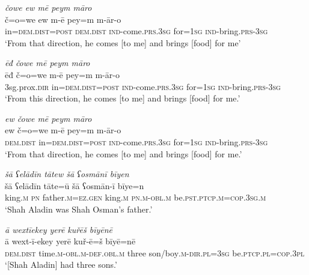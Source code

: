 \ea \label{PM.46}
\textit{čowe ew mē peym māro} \\ 
\gll č=o=we ew m-ē pey=m m-ār-o \\ 
 in=\textsc{dem.dist}\textsc{=\textsc{post}} \textsc{dem.dist} \textsc{ind-}come\textsc{.prs}\textsc{.3sg} for\textsc{=\textsc{1sg}} \textsc{ind-}bring\textsc{.prs}\textsc{-3sg} \\ 
\glt `From that direction, he  comes [to me] and brings [food] for me'
\z 
 
\ea \label{PM.47}
\textit{ēđ čowe mē peym māro} \\ 
\gll ēđ č=o=we m-ē pey=m m-ār-o \\ 
 3sg.prox\textsc{.dir} in=\textsc{dem.dist}\textsc{=\textsc{post}} \textsc{ind-}come\textsc{.prs}\textsc{.3sg} for\textsc{=\textsc{1sg}} \textsc{ind-}bring\textsc{.prs}\textsc{-3sg} \\ 
\glt `From this direction, he  comes [to me] and brings [food] for me.'
\z 
 
\ea \label{PM.48}
\textit{ew čowe mē peym māro} \\ 
\gll ew č=o=we m-ē pey=m m-ār-o \\ 
 \textsc{dem.dist} in=\textsc{dem.dist}\textsc{=\textsc{post}} \textsc{ind-}come\textsc{.prs}\textsc{.3sg} for\textsc{=\textsc{1sg}} \textsc{ind-}bring\textsc{.prs}\textsc{-3sg} \\ 
\glt `From that direction, he  comes [to me] and brings [food] for me.'
\z 
 
\ea \label{DG.2}
\textit{šā ʕelādīn tātew šā ʕosmānī bīyen} \\ 
\gll šā ʕelādīn tāte=ū šā ʕosmān-ī bīye=n \\ 
 king\textsc{.m} \textsc{pn} father\textsc{.m}\textsc{=ez}\textsc{.gen} king\textsc{.m} \textsc{pn}\textsc{.m}\textsc{-obl}\textsc{.m} be\textsc{.pst}\textsc{.ptcp}\textsc{.m}\textsc{=cop}\textsc{.3sg}\textsc{.m} \\ 
\glt `Shah Aladin was Shah Osman’s father.'
\z 
 
\ea \label{DG.3}
\textit{ā wextīekey yerē kuřēš bīyēnē} \\ 
\gll ā wext-ī-ekey yerē kuř-ē=š bīyē=nē \\ 
 \textsc{dem.dist} time\textsc{.m}\textsc{-obl}\textsc{.m}\textsc{-def}\textsc{.obl}\textsc{.m} three son/boy\textsc{.m}\textsc{-dir}\textsc{.pl}\textsc{=3sg} be\textsc{.ptcp}\textsc{.pl}\textsc{=cop}\textsc{.3pl} \\ 
\glt `[Shah Aladin] had three sons.'
\z 
 
